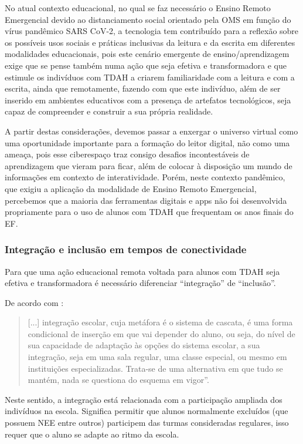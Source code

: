 \documentclass{textolivre}
\begin{document}
No atual contexto educacional, no qual se faz necessário o Ensino Remoto Emergencial devido ao distanciamento social orientado pela OMS em função do vírus pandêmico SARS CoV-2, a tecnologia tem contribuído para a reflexão sobre os possíveis usos sociais e práticas inclusivas da leitura e da escrita em diferentes modalidades educacionais, pois este cenário emergente de ensino/aprendizagem exige que se pense também numa ação que seja efetiva e transformadora e que estimule os indivíduos com TDAH a criarem familiaridade com a leitura e com a escrita, ainda que remotamente, fazendo com que este indivíduo, além de ser inserido em ambientes educativos com a presença de artefatos tecnológicos, seja capaz de compreender e construir a sua própria realidade. 

A partir destas considerações, devemos passar a enxergar o universo virtual como uma oportunidade importante para a formação do leitor digital, não como uma ameaça, pois esse ciberespaço traz consigo desafios incontestáveis de aprendizagem que vieram para ficar, além de colocar à disposição um mundo de informações em contexto de interatividade. Porém, neste contexto pandêmico, que exigiu a aplicação da modalidade de Ensino Remoto Emergencial, percebemos que a maioria das ferramentas digitais e apps não foi desenvolvida propriamente para o uso de alunos com TDAH que frequentam os anos finais do EF. 

\subsubsection{Integração e inclusão em tempos de conectividade}\label{sec-integracao}
Para que uma ação educacional remota voltada para alunos com TDAH seja efetiva e transformadora é necessário diferenciar “integração” de “inclusão”. 

De acordo com \textcite[p. 2]{borgesdalberio_inclusao_2012}:

\begin{quote}
    [...] integração escolar, cuja metáfora é o sistema de cascata, é uma forma condicional de inserção em que vai depender do aluno, ou seja, do nível de sua capacidade de adaptação às opções do sistema escolar, a sua integração, seja em uma sala regular, uma classe especial, ou mesmo em instituições especializadas. Trata-se de uma alternativa em que tudo se mantém, nada se questiona do esquema em vigor”.
\end{quote}

Neste sentido, a integração está relacionada com a participação ampliada dos indivíduos na escola. Significa permitir que alunos normalmente excluídos (que possuem NEE entre outros) participem das turmas consideradas regulares, isso requer que o aluno se adapte ao ritmo da escola. 
\end{document}
